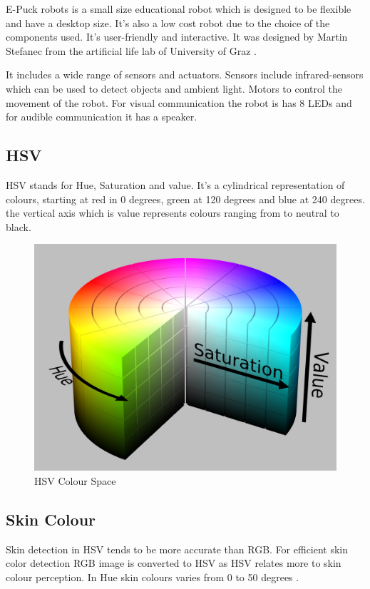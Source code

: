 E-Puck robots is a small size educational robot which is designed to be flexible and have a desktop size. It's also a low cost robot due to the choice of the components used. It's user-friendly and interactive. It was designed by Martin Stefanec from the artificial life lab of University of Graz \cite{epuck}. 

It includes a wide range of sensors and actuators. Sensors include infrared-sensors which can be used to detect objects and ambient light. Motors to control the movement of the robot. For visual communication the robot is has 8 LEDs and for audible communication it has a speaker.

\subsection{HSV}


HSV stands for Hue, Saturation and value. It's a cylindrical representation of colours, starting at red in 0 degrees, green at 120 degrees and blue at 240 degrees. the vertical axis which is value represents colours ranging from to neutral to black.

\begin{figure}
	\centering
	\includegraphics[width=0.7\linewidth]{figures/hsv}
	\caption{HSV Colour Space}
	\label{fig:hsv}
\end{figure}


\subsection{Skin Colour}

Skin detection in HSV tends to be more accurate than RGB. For efficient skin color detection RGB image is converted to HSV as HSV relates more to skin colour perception. In Hue skin colours varies from 0 to 50 degrees \cite{hsv_skin}. 
 